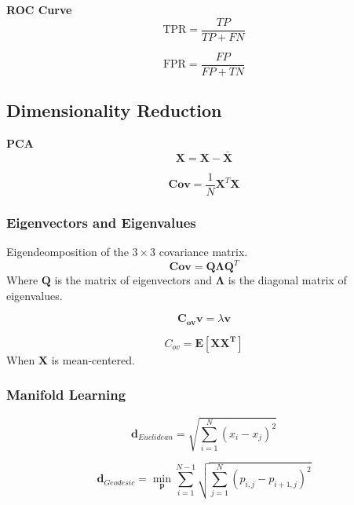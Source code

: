 \documentclass[8pt]{article}
\begin{document}
\begin{multicols}{2}
\textbf{ROC Curve}
\begin{equation}
    \text{TPR} = \frac{TP}{TP + FN}
\end{equation}

\begin{equation}
    \text{FPR} = \frac{FP}{FP + TN}
\end{equation}

\subsection*{Dimensionality Reduction}
\textbf{PCA}
\begin{equation}
    \mathbf{X} = \mathbf{X} - \bar{\mathbf{X}}
\end{equation}

\begin{equation}
    \mathbf{Cov} = \frac{1}{N} \mathbf{X}^T \mathbf{X}
\end{equation}

\subsubsection*{Eigenvectors and Eigenvalues}
Eigendeomposition of the $3 \times 3$ covariance matrix.
\begin{equation}
    \mathbf{Cov} = \mathbf{Q} \mathbf{\Lambda} \mathbf{Q}^T
\end{equation}
Where $\mathbf{Q}$ is the matrix of eigenvectors and $\mathbf{\Lambda}$ is the diagonal matrix of eigenvalues.

\begin{equation}
    \mathbf{C_{ov}} \mathbf{v} = \lambda \mathbf{v}
\end{equation}

\begin{equation}
    C_{ov} = \mathbf{E}[\mathbf{XX^T}]
\end{equation}
When $\mathbf{X}$ is mean-centered.

\subsubsection*{Manifold Learning}
\begin{equation}
    \mathbf{d}_{Euclidean} = \sqrt{\sum_{i=1}^{N} (x_i - x_j)^2}
\end{equation}

\begin{equation}
    \mathbf{d}_{Geodesic} = \min_{\mathbf{p}} \sum_{i=1}^{N-1} \sqrt{\sum_{j=1}^{N} (p_{i,j} - p_{i+1,j})^2}
    \label{eq:geodesic}
\end{equation}


\end{multicols}
\end{document}
